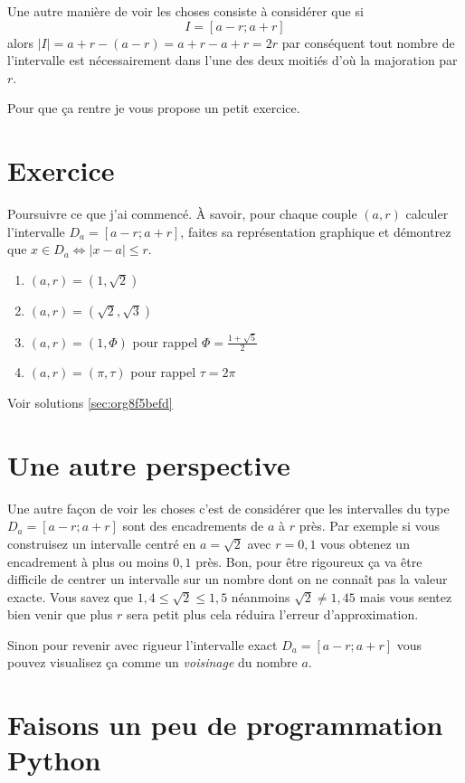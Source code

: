 \documentclass[a4paper, 11pt, twoside]{book}
\begin{document}
Une autre manière de voir les choses consiste à considérer que si
\[I = [a - r ; a + r]\] alors \(|I| = a + r - (a - r) = a + r - a +
   r = 2r\) par conséquent tout nombre de l'intervalle est
nécessairement dans l'une des deux moitiés d'où la majoration par
\(r\).

Pour que ça rentre je vous propose un petit exercice.

\section{Exercice}
\label{sec:org3670b00}
Poursuivre ce que j'ai commencé. À savoir, pour chaque couple \((a,
    r)\) calculer l'intervalle \(D_a = [a - r ; a + r]\), faites sa
représentation graphique et démontrez que \(x\in D_a \iff \lvert
    x - a \rvert \leq r\).

\begin{enumerate}
\item \((a, r) = (1, \sqrt{2})\)
\item \((a, r) = (\sqrt{2}, \sqrt{3})\)
\item \((a, r) = (1, \Phi)\) pour rappel \(\Phi = \frac{1 +
       \sqrt{5}}{2}\)
\item \((a, r) = (\pi, \tau)\) pour rappel \(\tau = 2\pi\)
\end{enumerate}


Voir solutions \ref{sec:org8f5befd}

\section{Une autre perspective}
\label{sec:orgf692c5a}

Une autre façon de voir les choses c'est de considérer que les
intervalles du type \(D_a = [a - r ; a + r]\) sont des encadrements
de \(a\) à \(r\) près. Par exemple si vous construisez un intervalle
centré en \(a = \sqrt{2}\) avec \(r = 0,1\) vous obtenez un
encadrement à plus ou moins \(0,1\) près. Bon, pour être rigoureux
ça va être difficile de centrer un intervalle sur un nombre dont
on ne connaît pas la valeur exacte. Vous savez que \(1,4 \leq
    \sqrt{2} \leq 1,5\) néanmoins \(\sqrt{2} \neq 1,45\) mais vous sentez
bien venir que plus \(r\) sera petit plus cela réduira l'erreur
d'approximation.

Sinon pour revenir avec rigueur l'intervalle exact \(D_a = [a - r ;
    a + r]\) vous pouvez visualisez ça comme un \emph{voisinage} du nombre
\(a\).

\section{Faisons un peu de programmation Python}
\label{sec:orgcf2649a}
\end{document}
